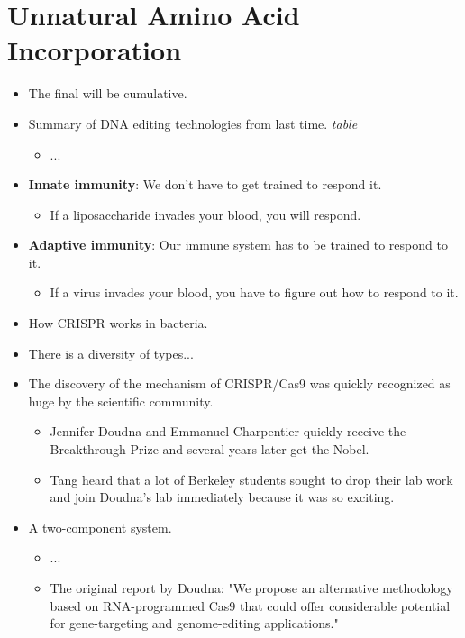 \documentclass[../notes.tex]{subfiles}
\begin{document}
\section{Unnatural Amino Acid Incorporation}
\begin{itemize}
    \item {}The final will be cumulative.
    \item Summary of DNA editing technologies from last time.
    \emph{table}
    \begin{itemize}
        \item ...
    \end{itemize}
    \item \textbf{Innate immunity}: We don't have to get trained to respond it.
    \begin{itemize}
        \item If a liposaccharide invades your blood, you will respond.
    \end{itemize}
    \item \textbf{Adaptive immunity}: Our immune system has to be trained to respond to it.
    \begin{itemize}
        \item If a virus invades your blood, you have to figure out how to respond to it.
    \end{itemize}
    \item How CRISPR works in bacteria.
    \item There is a diversity of types...
    \item The discovery of the mechanism of CRISPR/Cas9 was quickly recognized as huge by the scientific community.
    \begin{itemize}
        \item Jennifer Doudna and Emmanuel Charpentier quickly receive the Breakthrough Prize and several years later get the Nobel.
        \item Tang heard that a lot of Berkeley students sought to drop their lab work and join Doudna's lab immediately because it was so exciting.
    \end{itemize}
    \item A two-component system.
    \begin{itemize}
        \item ...
        \item The original report by Doudna: "We propose an alternative methodology based on RNA-programmed Cas9 that could offer considerable potential for gene-targeting and genome-editing applications."

\end{itemize}
\end{itemize}
\end{document}
